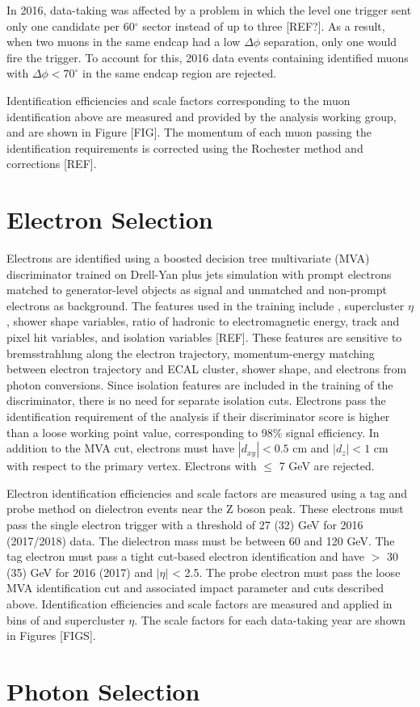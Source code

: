 In 2016, data-taking was affected by a problem in which the level one trigger sent only one candidate per 60$^{\circ}$ sector instead 
of up to three [REF?]. As a result, when two muons in the same endcap had a low $\Delta \phi$ separation, only one would fire the 
trigger. To account for this, 2016 data events containing identified muons with $\Delta \phi < 70^{\circ}$ in the same endcap region 
are rejected. 

Identification efficiencies and scale factors corresponding to the muon identification above are measured and provided by the 
\hzz analysis working group, and are shown in Figure [FIG]. The momentum of each muon passing the identification requirements is 
corrected using the Rochester method and corrections [REF]. 



\section{Electron Selection}
Electrons are identified using a boosted decision tree multivariate (MVA) discriminator trained on Drell-Yan plus jets simulation 
with prompt electrons matched to generator-level objects as signal and unmatched and non-prompt electrons as background. The features 
used in the training include \pT, supercluster $\eta$, shower shape variables, ratio of hadronic to electromagnetic energy, track and 
pixel hit variables, and isolation variables [REF]. These features are sensitive to bremsstrahlung along the electron trajectory, 
momentum-energy matching between electron trajectory and ECAL cluster, shower shape, and electrons from photon conversions.
Since isolation features are included in the training of the discriminator, there is no need for separate isolation cuts. 
Electrons pass the identification requirement of the \hzg analysis if their discriminator score is higher than a loose working point 
value, corresponding to 98\% signal efficiency. In addition to the MVA cut, electrons must have $|d_{xy}| < 0.5$ cm and $|d_{z}| < 1$ cm
with respect to the primary vertex. Electrons with \pT $\leq$ 7 GeV are rejected. 

Electron identification efficiencies and scale factors are measured using a tag and probe method on dielectron events near the 
Z boson peak. These electrons must pass the single electron trigger with a \pT threshold of 27 (32) GeV for 2016 (2017/2018) data. 
The dielectron mass must be between 60 and 120 GeV. The tag electron must pass a tight cut-based electron identification and have 
\pT $>$ 30 (35) GeV for 2016 (2017) and $|\eta|$ < 2.5. The probe electron must pass the loose MVA identification cut and associated 
impact parameter and \pT cuts described above. Identification efficiencies and scale factors are measured and applied in bins of 
\pT and supercluster $\eta$. The scale factors for each data-taking year are shown in Figures [FIGS]. 

\section{Photon Selection}
